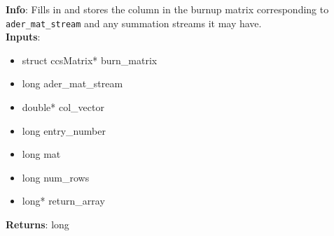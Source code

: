 \textbf{Info}: Fills in and stores the column in the burnup matrix corresponding
to \texttt{ader\_mat\_stream} and any summation streams it may have.\\

\noindent \textbf{Inputs}:
\begin{itemize}
\item{struct ccsMatrix* burn\_matrix}
\item{long ader\_mat\_stream}
\item{double* col\_vector}
\item{long entry\_number}
\item{long mat}
\item{long num\_rows}
\item{long* return\_array}
\end{itemize}

\noindent \textbf{Returns}: long

